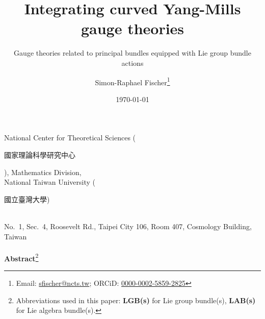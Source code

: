 \documentclass[a4paper,oneside,11pt,bibliography=totoc]{scrartcl}
\theoremstyle{plain}
\theoremstyle{remark}
\theoremstyle{definition}
\begin{document}
\renewcommand{\thefootnote}{\fnsymbol{footnote}}

\begin{titlepage}

\author{Simon-Raphael Fischer\footnote{Email: \href{mailto:sfischer@ncts.tw}{sfischer@ncts.tw}; ORCiD: \href{https://orcid.org/0000-0002-5859-2825}{0000-0002-5859-2825}} }
\title{Integrating curved Yang-Mills gauge theories} 
\subtitle{Gauge theories related to principal bundles equipped with Lie group bundle actions}
\date{\today} 
\maketitle
\thispagestyle{empty}

\begin{center}
National Center for Theoretical Sciences (\begin{CJK*}{UTF8}{bsmi}國家理論科學研究中心\end{CJK*}),
Mathematics Division,
\\
National Taiwan University
(\begin{CJK*}{UTF8}{bsmi}國立臺灣大學)\end{CJK*}
\\
No.\ 1, Sec.\ 4, Roosevelt Rd., Taipei City 106, Room 407, Cosmology Building, Taiwan
\ \\
\ \\
\textbf{Abstract}\footnote[2]{Abbreviations used in this paper: \textbf{LGB(s)} for Lie group bundle(s), \textbf{LAB(s)} for Lie algebra bundle(s).}
\begin{abstract}
  \small{
}
\end{abstract}
\end{center}
\end{titlepage}
\end{document}
